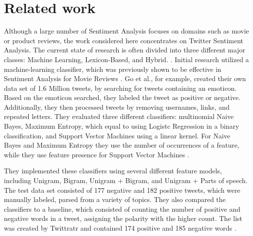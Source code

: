 \chapter{Related work}
\label{cha:Chapter2_RelatedWork}
\iffalse

Length: 1-2 pages

Effort: ~2 weeks

2-3 Arbeiten maximal, die genauer betrachtet werden
Ruhig mehr Zitate --> aber nicht detailliert betrachten
Introduction to Data Mining --> zu generell, nur als Zitat
Hier nur im engsten Sinne


Content
\begin{itemize}
\item Alec Go, Richa Bhayani, and Lei Huang. 2009. Twitter Sentiment Classification Using Distant Supervision.
Technical Report. Standford.
\item Taboada or Serendio or Vader?
\item Khuc et al.
\end{itemize}

\fi

Although a large number of Sentiment Analysis focuses on domains such as movie or product reviews, the work considered here concentrates on Twitter Sentiment Analysis. The current state of research is often divided into three different major classes: Machine Learning, Lexicon-Based, and Hybrid. \cite{DBLP:journals/csur/GiachanouC16}. Initial research utilized a machine-learning classifier, which was previously shown to be effective in Sentiment Analysis for Movie Reviews \cite{GoBHaHua2009}. Go et al., for example, created their own data set of 1.6 Million tweets, by searching for tweets containing an emoticon. Based on the emoticon searched, they labeled the tweet as positive or negative. Additionally, they then processed tweets by removing usernames, links, and repeated letters. They evaluated three different classifiers: multinomial Naive Bayes, Maximum Entropy, which equal to using Logistc Regression in a binary classification, and Support Vector Machines using a linear kernel. For Naive Bayes and Maximum Entropy they use the number of occurrences of a feature, while they use feature presence for Support Vector Machines \cite{GoBHaHua2009}. 

They implemented these classifiers using several different feature models, including Unigram, Bigram, Unigram + Bigram, and Unigram + Parts of speech. The test data set consisted of 177 negative and 182 positive tweets, which were manually labeled, parsed from a variety of topics. They also compared the classifiers to a baseline, which consisted of counting the number of positive and negative words in a tweet, assigning the polarity with the higher count. The list was created by Twittratr and contained 174 positive and 185 negative words \cite{GoBHaHua2009}. 

